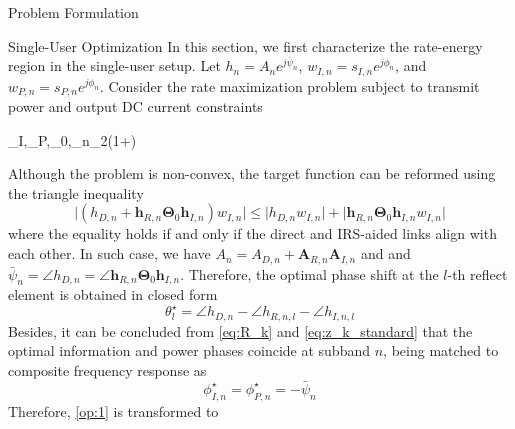\documentclass{IEEEtran}
\begin{document}
\begin{section}{Problem Formulation}
	\begin{subsection}{Single-User Optimization}
		In this section, we first characterize the rate-energy region in the single-user setup. Let $h_n={A_n}{e^{j{\bar{\psi}_n}}}$, $w_{I,n}=s_{I,n}e^{j{\phi}_n}$, and $w_{P,n}=s_{P,n}e^{j{\phi}_n}$. Consider the rate maximization problem subject to transmit power and output DC current constraints
		\begin{maxi}
			{\boldsymbol{w}_I,_P,\boldsymbol{\Theta}_0,\rho}{\sum_{n}{\log_2\left(1+\right)}}{\label{op:1}}{}
		\end{maxi}
		Although the problem is non-convex, the target function can be reformed using the triangle inequality
		\begin{equation}
			\lvert{(h_{D,n}+\boldsymbol{h}_{R,n}\boldsymbol{\Theta}_0\boldsymbol{h}_{I,n})w_{I,n}}\rvert \le \lvert{h_{D,n}w_{I,n}}\rvert+\lvert{\boldsymbol{h}_{R,n}\boldsymbol{\Theta}_0\boldsymbol{h}_{I,n}w_{I,n}}\rvert
		\end{equation}
		where the equality holds if and only if the direct and IRS-aided links align with each other. In such case, we have $A_n=A_{D,n}+\boldsymbol{A}_{R,n}\boldsymbol{A}_{I,n}$ and and $\bar{\psi}_n=\angle{h_{D,n}}=\angle{\boldsymbol{h}_{R,n}\boldsymbol{\Theta}_0\boldsymbol{h}_{I,n}}$. Therefore, the optimal phase shift at the $l$-th reflect element is obtained in closed form
		\begin{equation}
			\theta_l^\star=\angle{h_{D,n}}-\angle{h_{R,n,l}}-\angle{h_{I,n,l}}
		\end{equation}
		Besides, it can be concluded from \ref{eq:R_k} and \ref{eq:z_k_standard} that the optimal information and power phases coincide at subband $n$, being matched to composite frequency response as
		\begin{equation}\label{eq:phi_n}
			\phi_{I,n}^\star=\phi_{P,n}^\star=-\bar{\psi}_n
		\end{equation}
		Therefore, \ref{op:1} is transformed to
		\begin{maxi}

\end{maxi}
\end{subsection}
\end{section}
\end{document}
